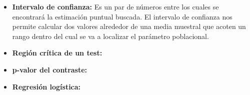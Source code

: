 \documentclass[12pt,a4paper]{article}
\begin{document}
\begin{itemize}
    \item \textbf{Intervalo de confianza:} Es un par de números entre los cuales se encontrará la estimación puntual buscada. El intervalo de confianza nos permite calcular dos valores alrededor de una media muestral que acoten un rango dentro del cual se va a localizar el parámetro poblacional.
    
    \item \textbf{Región crítica de un test:}
    
    \item \textbf{p-valor del contraste:}
    
    \item \textbf{Regresión logística:}
\end{itemize}
\end{document}

